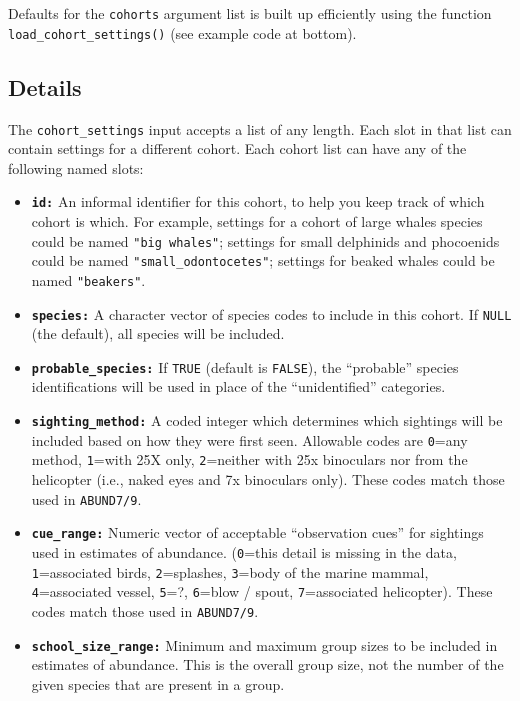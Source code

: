 \documentclass[
]{book}
\begin{document}
Defaults for the \texttt{cohorts} argument list is built up efficiently using the function \texttt{load\_cohort\_settings()} (see example code at bottom).

\hypertarget{details-1}{%
\subsection*{Details}\label{details-1}}

The \texttt{cohort\_settings} input accepts a list of any length. Each slot in that list can contain settings for a different cohort. Each cohort list can have any of the following named slots:

\begin{itemize}
\item
  \textbf{\texttt{id:}} An informal identifier for this cohort, to help you keep track of which cohort is which. For example, settings for a cohort of large whales species could be named \texttt{"big\ whales"}; settings for small delphinids and phocoenids could be named \texttt{"small\_odontocetes"}; settings for beaked whales could be named \texttt{"beakers"}.
\item
  \textbf{\texttt{species:}} A character vector of species codes to include in this cohort. If \texttt{NULL} (the default), all species will be included.
\item
  \textbf{\texttt{probable\_species:}} If \texttt{TRUE} (default is \texttt{FALSE}), the ``probable'' species identifications will be used in place of the ``unidentified'' categories.
\item
  \textbf{\texttt{sighting\_method:}} A coded integer which determines which sightings will be included based on how they were first seen. Allowable codes are \texttt{0}=any method, \texttt{1}=with 25X only, \texttt{2}=neither with 25x binoculars nor from the helicopter (i.e., naked eyes and 7x binoculars only). These codes match those used in \texttt{ABUND7/9}.
\item
  \textbf{\texttt{cue\_range:}} Numeric vector of acceptable ``observation cues'' for sightings used in estimates of abundance. (\texttt{0}=this detail is missing in the data, \texttt{1}=associated birds, \texttt{2}=splashes, \texttt{3}=body of the marine mammal, \texttt{4}=associated vessel, \texttt{5}=?, \texttt{6}=blow / spout, \texttt{7}=associated helicopter). These codes match those used in \texttt{ABUND7/9}.
\item
  \textbf{\texttt{school\_size\_range:}} Minimum and maximum group sizes to be included in estimates of abundance. This is the overall group size, not the number of the given species that are present in a group.

\end{itemize}
\end{document}
